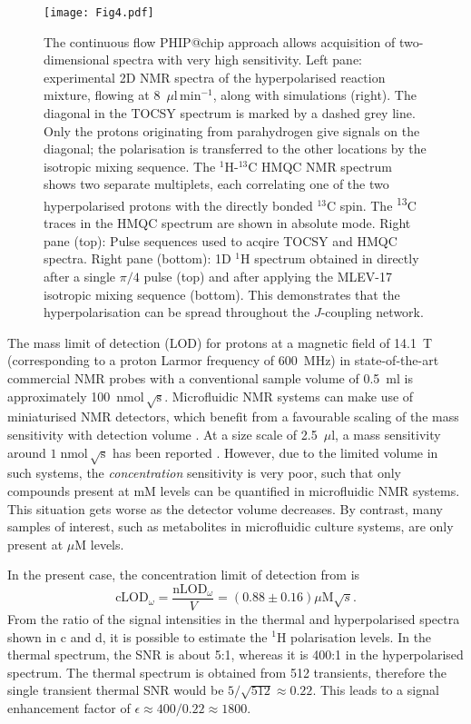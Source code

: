 \begin{figure*}[t]
	\centering
	\texttt{[image: Fig4.pdf]}
	\caption{
		The continuous flow PHIP@chip approach allows acquisition of
		two-dimensional spectra with very high sensitivity. Left pane:
		experimental 2D NMR spectra of the hyperpolarised reaction mixture,
		flowing at 8~$\mu\mathrm{l}\,\text{min}^{-1}$, along with simulations
		(right). The diagonal in the TOCSY spectrum is marked by a dashed grey
		line. Only the protons originating from parahydrogen give signals on
		the diagonal; the polarisation is transferred to the other locations by
		the isotropic mixing sequence.  The $^1$H-$^{13}$C HMQC NMR spectrum
		shows two separate multiplets, each correlating one of the two
		hyperpolarised protons with the directly bonded $^{13}$C spin. The
		\textsuperscript{13}C traces in the HMQC spectrum are shown in absolute
		mode.
		Right pane (top): Pulse sequences used to acqire TOCSY and HMQC
		spectra.
		Right pane (bottom):  1D $^1$H spectrum obtained in directly
		after a single $\pi/4$ pulse (top) and after applying the
		MLEV-17 isotropic mixing sequence (bottom). This demonstrates
		that the hyperpolarisation can be spread throughout the $J$-coupling
		network.
}
	\label{fig:phip@chip4}
\end{figure*}

The mass limit of detection (LOD) for
protons at a magnetic field of 14.1~T (corresponding to a proton Larmor frequency
of 600~MHz) in state-of-the-art commercial NMR probes with a
conventional sample volume of 0.5~ml is approximately
100~$\text{nmol}\,\sqrt{\text{s}}$.
Microfluidic NMR systems can make use of miniaturised NMR detectors,
which benefit from a favourable scaling of the mass sensitivity
with detection volume \cite{Olson:1995vu,Badilita:2011td,Zalesskiy:2014hi}. At a size scale
of 2.5~$\mu\mathrm{l}$, a mass sensitivity around
$1\;\text{nmol}\,\sqrt{\text{s}}$
has been reported \cite{Finch:2016gv}.
However, due to the limited volume in such systems,
the \emph{concentration} sensitivity is very poor, such that
only compounds present at mM levels can be quantified
in microfluidic NMR systems. This situation gets worse as the detector
volume decreases. By contrast, many samples of interest, such as
metabolites in microfluidic culture systems, are only present
at $\mu$M levels.

In the present
case, the concentration limit of detection from  is
\begin{equation}
\text{cLOD}_\omega =
\frac{\text{nLOD}_\omega}{V} = (0.88 ± 0.16)\mu\text{M}\sqrt{s}.
\end{equation}
From the ratio of the signal intensities in the thermal and hyperpolarised
spectra shown in c and d, it is possible to estimate the
$\mathrm{^1H}$ polarisation levels. In the thermal spectrum, the SNR is about
5:1, whereas it is 400:1 in the hyperpolarised spectrum. The thermal spectrum is
obtained from 512 transients, therefore the single transient thermal SNR would
be $5/\sqrt{512}\approx 0.22$. This leads to a signal enhancement factor of
$\epsilon\approx 400/0.22 \approx 1800$.

